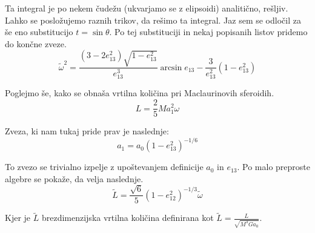 \documentclass{article}
\theoremstyle{definition}
\theoremstyle{plain}
\numberwithin{definition}{section}
\numberwithin{theorem}{section}
\begin{document}
Ta integral je po nekem čudežu (ukvarjamo se z elipsoidi) analitično, rešljiv. 
Lahko se posložujemo raznih trikov, da rešimo ta integral. Jaz sem se odločil
za še eno substitucijo $t = \sin \theta$. Po tej substituciji in nekaj
popisanih listov pridemo do končne zveze.
\begin{equation}
	\tilde{\omega}^2 = 
	\frac{(3 - 2e_{13}^2) \sqrt{1 - e_{13}^2}}{e_{13}^3} \arcsin{e_{13}} - 
	\frac{3}{e_{13}^2}(1 - e_{13}^2)
	\label{eq:mc_kotna_hitrost}
\end{equation}


Poglejmo še, kako se obnaša vrtilna količina pri Maclaurinovih sferoidih.
\begin{equation}
	L = \frac{2}{5} M a_1^2 \omega
	\label{eq:def_vrtilne_mac}
\end{equation}

Zveza, ki nam tukaj pride prav je naslednje:
\begin{equation}
	a_1 = a_0 (1 - e_{13}^2)^{-1/6}
	\label{eq:a1_a0}
\end{equation}

To zvezo se trivialno izpelje z upoštevanjem definicije $a_0$ in $e_{13}$. 
Po malo preproste algebre se pokaže, da velja naslednje.
\begin{equation}
	\tilde{L} = \frac{\sqrt{6}}{5} (1 - e_{12}^2)^{-1/3} \tilde{\omega}
	\label{eq:mc_vrtilna_kolicina}
\end{equation}

Kjer je $\tilde{L}$ brezdimenzijska vrtilna količina definirana kot
$\tilde{L} = \frac{L}{\sqrt{M^3 G a_0}}$.



% 
% 
% 
\end{document}
